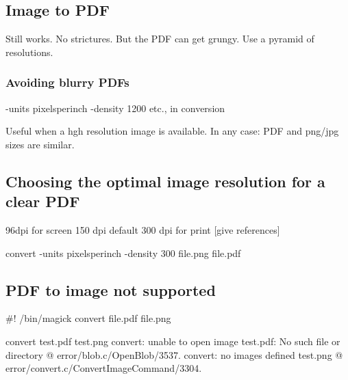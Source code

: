 \documentclass[
  11pt,
  british,
  a4paper,
]{article}
\newenvironment{Shaded}{\begin{snugshade}}{\end{snugshade}}
\newcommand{\AttributeTok}[1]{\textcolor[rgb]{0.80,0.80,0.80}{#1}}
\newcommand{\CommentTok}[1]{\textcolor[rgb]{0.50,0.62,0.50}{#1}}
\newcommand{\ExtensionTok}[1]{\textcolor[rgb]{0.80,0.80,0.80}{#1}}
\newcommand{\KeywordTok}[1]{\textcolor[rgb]{0.94,0.87,0.69}{#1}}
\newcommand{\NormalTok}[1]{\textcolor[rgb]{0.80,0.80,0.80}{#1}}
\newcommand{\StringTok}[1]{\textcolor[rgb]{0.80,0.58,0.58}{#1}}
\begin{document}
\hypertarget{image-to-pdf}{%
\subsection{Image to PDF}\label{image-to-pdf}}

Still works. No strictures. But the PDF can get grungy. Use a pyramid of
resolutions.

\hypertarget{avoiding-blurry-pdfs}{%
\subsubsection{Avoiding blurry PDFs}\label{avoiding-blurry-pdfs}}

-units pixelsperinch -density 1200 etc., in conversion

Useful when a hgh resolution image is available. In any case: PDF and
png/jpg sizes are similar.

\hypertarget{choosing-the-optimal-image-resolution-for-a-clear-pdf}{%
\subsection{Choosing the optimal image resolution for a clear
PDF}\label{choosing-the-optimal-image-resolution-for-a-clear-pdf}}

96dpi for screen 150 dpi default 300 dpi for print {[}give references{]}

\begin{Shaded}
\begin{Highlighting}[]
\ExtensionTok{convert} \AttributeTok{{-}units}\NormalTok{ pixelsperinch }\AttributeTok{{-}density}\NormalTok{ 300 file.png file.pdf}
\end{Highlighting}
\end{Shaded}

\hypertarget{pdf-to-image-not-supported}{%
\subsection{PDF to image not
supported}\label{pdf-to-image-not-supported}}

\begin{Shaded}
\begin{Highlighting}[]
\CommentTok{\#! /bin/magick}
\ExtensionTok{convert}\NormalTok{ file.pdf file.png}
\end{Highlighting}
\end{Shaded}

\begin{Shaded}
\begin{Highlighting}[]
\ExtensionTok{convert}\NormalTok{ test.pdf test.png}
\ExtensionTok{convert:}\NormalTok{ unable to open image }\StringTok{\textquotesingle{}test.pdf\textquotesingle{}}\NormalTok{: No such file or directory @ error/blob.c/OpenBlob/3537.}
\ExtensionTok{convert:}\NormalTok{ no images defined }\KeywordTok{\textasciigrave{}}\ExtensionTok{test.png}\StringTok{\textquotesingle{} @ error/convert.c/ConvertImageCommand/3304.}
\end{Highlighting}
\end{Shaded}
\end{document}
